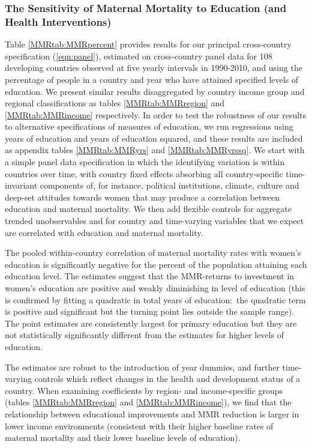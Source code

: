 \documentclass{article}[12pt,subeqn]
\begin{document}
\begin{spacing}{1.4}
\subsubsection{The Sensitivity of Maternal Mortality to Education (and Health 
Interventions)}
Table \ref{MMRtab:MMRpercent} provides results for our principal cross-country 
specification (\ref{eqn:panel}), estimated on cross-country panel data for 108 
developing countries observed at five yearly intervals in 1990-2010, and using 
the percentage 
of people in a country and year who have attained specified levels of education. 
We present similar results disaggregated by country income group and regional 
classifications as tables \ref{MMRtab:MMRregion} and \ref{MMRtab:MMRincome} 
respectively. In order to test the robustness of our results to alternative 
specifications of measures of education, we run regressions using years of 
education and years of education squared, and these results are included as 
appendix tables \ref{MMRtab:MMRyrs} and \ref{MMRtab:MMRyrssq}. We start with a 
simple panel data specification in which the identifying variation is within 
countries over time, with country fixed effects absorbing all country-specific 
time-invariant components of, for instance, political institutions, climate, 
culture and deep-set attitudes towards women that may produce a correlation 
between education and maternal mortality. We then add flexible controls for 
aggregate trended unobservables and for country and time-varying variables that 
we expect are correlated with education and maternal mortality.

The pooled within-country correlation of maternal mortality rates with women's 
education is significantly negative for the percent of the population attaining 
each education level. The estimates suggest that the MMR-returns to investment 
in women's education are positive and weakly diminishing in level of education
(this is confirmed by fitting a quadratic in total years of education:\ the 
quadratic term is positive and significant but the turning point lies outside 
the sample range). The point estimates are consistently largest for primary 
education but they are not statistically significantly different from the 
estimates for higher levels of education.

The estimates are robust to the introduction of year dummies, and further 
time-varying controls which reflect changes in the health and development status 
of a country. When examining coefficients by region- and income-specific groups 
(tables \ref{MMRtab:MMRregion} and \ref{MMRtab:MMRincome}), we find that the 
relationship between educational improvements and MMR reduction is larger in lower 
income environments (consistent with their higher baseline rates of maternal 
mortality and their lower baseline levels of education).


\end{spacing}
\end{document}
